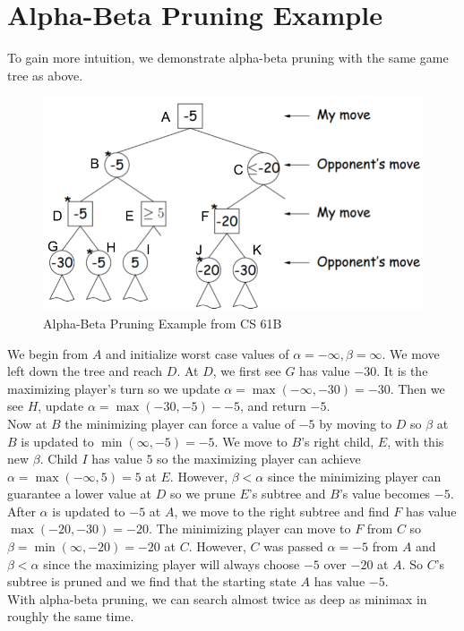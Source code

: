 \documentclass[12pt, letterpaper]{article}
\begin{document}
\section*{Alpha-Beta Pruning Example}
To gain more intuition, we demonstrate alpha-beta pruning with the same game tree as above.
\begin{figure}[H]
\centering
\includegraphics[scale=0.4]{alpha-beta.png}
\caption*{Alpha-Beta Pruning Example from CS 61B}
\end{figure}
We begin from $A$ and initialize worst case values of $\alpha = -\infty, \beta = \infty$. We move left down the tree and reach $D$. At $D$, we first see $G$ has value $-30$. It is the maximizing player's turn so we update $\alpha = \max(-\infty, -30) = -30$. Then we see $H$, update $\alpha = \max(-30, -5) - -5$, and return $-5$. \\[0.2cm]
Now at $B$ the minimizing player can force a value of $-5$ by moving to $D$ so $\beta$ at $B$ is updated to $\min(\infty, -5) = -5$. We move to $B$'s right child, $E$, with this new $\beta$. Child $I$ has value $5$ so the maximizing player can achieve $\alpha = \max(-\infty, 5) = 5$ at $E$. However, $\beta < \alpha$ since the minimizing player can guarantee a lower value at $D$ so we prune $E$'s subtree and $B$'s value becomes $-5$. \\[0.2cm]
After $\alpha$ is updated to $-5$ at $A$, we move to the right subtree and find $F$ has value $\max(-20, -30) = -20$. The minimizing player can move to $F$ from $C$ so $\beta = \min(\infty, -20) = -20$ at $C$. However, $C$ was passed $\alpha = -5$ from $A$ and $\beta < \alpha$ since the maximizing player will always choose $-5$ over $-20$ at $A$. So $C$'s subtree is pruned and we find that the starting state $A$ has value $-5$. \\[0.2cm]
With alpha-beta pruning, we can search almost twice as deep as minimax in roughly the same time. \\[0.2cm]
\end{document}

